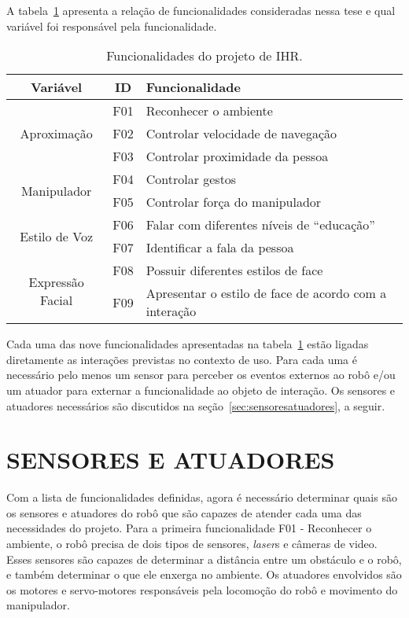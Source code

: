 A tabela~\ref{tab:funcionalidades} apresenta a relação de funcionalidades consideradas nessa tese e qual variável foi responsável pela funcionalidade.

\begin{table}[!ht]
	\caption{Funcionalidades do projeto de IHR.}
	\label{tab:funcionalidades}
	\centering
	\begin{tabular}{c | c | l}
        \hline
        Variável & ID & Funcionalidade \\
        \hline
		\multirow{3}{*}{Aproximação} & F01 & Reconhecer o ambiente \\
        \hhline{~--}
        & F02 & Controlar velocidade de navegação \\
        \hhline{~--}
        & F03 & Controlar proximidade da pessoa \\
        \hline
		\multirow{2}{*}{Manipulador} & F04 & Controlar gestos \\
        \hhline{~--}
        & F05 & Controlar força do manipulador \\
        \hline
		\multirow{2}{*}{Estilo de Voz} & F06 & Falar com diferentes níveis de ``educação'' \\
        \hhline{~--}
        & F07 & Identificar a fala da pessoa \\
        \hline
		\multirow{2}{*}{Expressão Facial} & F08 & Possuir diferentes estilos de face \\
		\hhline{~--}
		& F09 & Apresentar o estilo de face de acordo com a interação \\
		\hline
	\end{tabular}
\end{table}

Cada uma das nove funcionalidades apresentadas na tabela~\ref{tab:funcionalidades} estão ligadas diretamente as interações previstas no contexto de uso. Para cada uma é necessário pelo menos um sensor para perceber os eventos externos ao robô e/ou um atuador para externar a funcionalidade ao objeto de interação. Os sensores e atuadores necessários são discutidos na seção~\ref{sec:sensoresatuadores}, a seguir.

\section{SENSORES E ATUADORES}
\label{sec:ec_sensoresatuadores}
Com a lista de funcionalidades definidas, agora é necessário determinar quais são os sensores e atuadores do robô que são capazes de atender cada uma das necessidades do projeto. Para a primeira funcionalidade F01 - Reconhecer o ambiente, o robô precisa de dois tipos de sensores, \emph{laser}s e câmeras de video. Esses sensores são capazes de determinar a distância entre um obstáculo e o robô, e também determinar o que ele enxerga no ambiente. Os atuadores envolvidos são os motores e servo-motores responsáveis pela locomoção do robô e movimento do manipulador.

